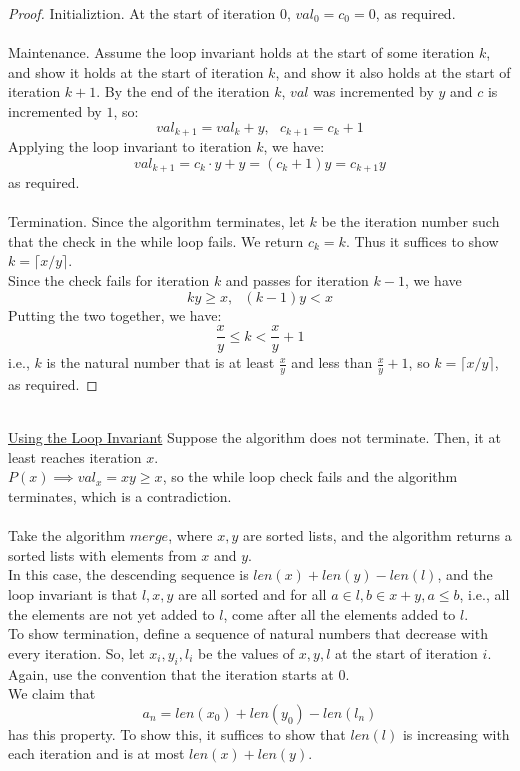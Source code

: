\documentclass{article}
\begin{document}
\begin{proof}
Initializtion. At the start of iteration 0, $val_0 = c_0 = 0$, as required.\\
\\
Maintenance. Assume the loop invariant holds at the start of some iteration $k$, and show it holds at the start of iteration $k$, and show it also holds at the start of iteration $k+1$. By the end of the iteration $k$, $val$ was incremented by $y$ and $c$ is incremented by $1$, so:
$$val_{k+1} = val_k + y, \ \ \ c_{k+1} = c_k+1$$
Applying the loop invariant to iteration $k$, we have:
$$val_{k+1} = c_k \cdot y + y = (c_k + 1)y = c_{k+1}y$$
as required.\\
\\
Termination. Since the algorithm terminates, let $k$ be the iteration number such that the check in the while loop fails. We return $c_k = k$. Thus it suffices to show $k = \lceil x/y \rceil$.\\
Since the check fails for iteration $k$ and passes for iteration $k-1$, we have
$$ky \geq x, \ \ \ (k-1)y < x$$
Putting the two together, we have:
$$\frac{x}{y} \leq k < \frac{x}{y} + 1$$
i.e., $k$ is the natural number that is at least $\frac{x}{y}$ and less than $\frac{x}{y} + 1$, so $k = \lceil x/y \rceil$, as required.
\end{proof}
\\
\underline{Using the Loop Invariant}
Suppose the algorithm does not terminate. Then, it at least reaches iteration $x$.\\
$P(x) \implies val_x = xy \geq x$, so the while loop check fails and the algorithm terminates, which is a contradiction. \\
\\
Take the algorithm $merge$, where $x,y$ are sorted lists, and the algorithm returns a sorted lists with elements from $x$ and $y$.\\
In this case, the descending sequence is $len(x) + len(y) - len(l)$, and the loop invariant is that $l,x,y$ are all sorted and for all $a \in l, b \in x + y, a\leq b$, i.e., all the elements are not yet added to $l$, come after all the elements added to $l$.\\
To show termination, define a sequence of natural numbers that decrease with every iteration. So, let $x_i, y_i, l_i$ be the values of $x,y,l$ at the start of iteration $i$. Again, use the convention that the iteration starts at $0$.\\
We claim that
$$a_n = len(x_0) + len(y_0) - len(l_n)$$
has this property. To show this, it suffices to show that $len(l)$ is increasing with each iteration and is at most $len(x) + len(y)$.\\
\end{document}
